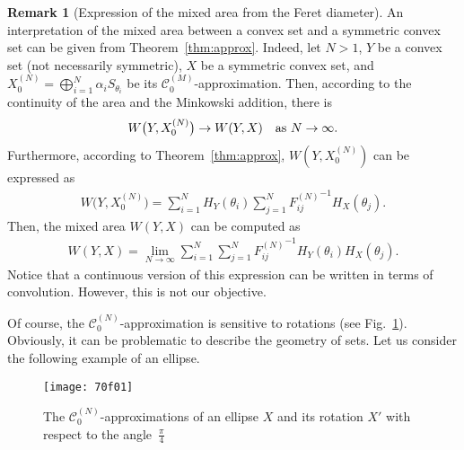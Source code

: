 \documentclass[numbers,compress,v1.0.1]{vmsta}
\theoremstyle{definition}
\newtheorem{remark}{Remark}
\begin{document}
\begin{remark}[Expression of the mixed area from the Feret diameter]
\label{rq:mixedareaapprox}
An interpretation of the mixed area between a convex set and a
symmetric convex set can be given from Theorem~\ref{thm:approx}.
Indeed, let $N>1$, $Y$ be a convex set \textup{(}not necessarily
symmetric\textup{)}, $X$ be a symmetric convex set, and
$X_0^{(N)}=\bigoplus^N_{i=1}\alpha_i S_{\theta_i}$ be its $\mathcal
{C}^{(M)}_0$-approximation. Then, according to the continuity of the
area and the Minkowski addition, there is
%
\begin{align*}
W\bigl(Y,X_0^{(N)}\bigr)\rightarrow W(Y,X)\text{\quad as } N
\rightarrow\infty.
\end{align*}
%
Furthermore, according to Theorem~\ref{thm:approx}, $W(Y,X_0^{(N)})$
can be expressed as
%
\begin{align*}
W\bigl(Y,X_0^{(N)}\bigr)=\sum
_{i=1}^N H_Y(\theta_i)\sum
_{j=1}^N {F^{(N)}_{ij}}^{-1}
H_X(\theta_j).
\end{align*}
%
Then, the mixed area $ W(Y,X)$ can be computed as
%
\begin{align*}
W(Y,X)= \underset{N\rightarrow\infty} {\lim} \sum_{i=1}^N
\sum_{j=1}^N {F^{(N)}_{ij}}^{-1}
H_Y(\theta_i)H_X(\theta_j).
\end{align*}
%
Notice that a continuous version of this expression can be written in
terms of convolution. However, this is not our objective.
\end{remark}

Of course, the $\mathcal{C}^{(N)}_0$-approximation is sensitive to
rotations (see Fig.~\ref{fig:worstandbetter}). Obviously, it can be
problematic to describe the geometry of sets. Let us consider the
following example of an ellipse.

\begin{figure}[t]
\texttt{[image: 70f01]}
\caption{The $\mathcal{C}^{(N)}_0$-approximations of an ellipse $X$ and
its rotation $X'$ with respect to the angle~$\frac{\pi}{4}$}
\label{fig:worstandbetter}
\end{figure}
\end{document}
